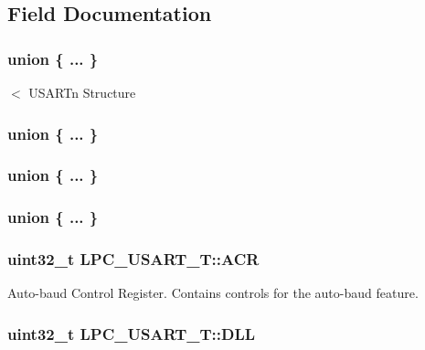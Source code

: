 \subsection{Field Documentation}
\hypertarget{structLPC__USART__T_a3ee22c4a9706e4fbaa69d0743fa3c269}{\subsubsection[{"@23}]{\setlength{\rightskip}{0pt plus 5cm}union \{ ... \} }}\label{structLPC__USART__T_a3ee22c4a9706e4fbaa69d0743fa3c269}
$<$ U\-S\-A\-R\-Tn Structure \hypertarget{structLPC__USART__T_ab1491a5ac3758bc997d3adb7d4f37d9f}{\subsubsection[{"@25}]{\setlength{\rightskip}{0pt plus 5cm}union \{ ... \} }}\label{structLPC__USART__T_ab1491a5ac3758bc997d3adb7d4f37d9f}
\hypertarget{structLPC__USART__T_a561feb6fc71da88f1f5bbfac07237cad}{\subsubsection[{"@27}]{\setlength{\rightskip}{0pt plus 5cm}union \{ ... \} }}\label{structLPC__USART__T_a561feb6fc71da88f1f5bbfac07237cad}
\hypertarget{structLPC__USART__T_a4d7be08518eac0076ed84428a59038e5}{\subsubsection[{"@29}]{\setlength{\rightskip}{0pt plus 5cm}union \{ ... \} }}\label{structLPC__USART__T_a4d7be08518eac0076ed84428a59038e5}
\hypertarget{structLPC__USART__T_a443bb067899c7f269dc903a26522f44b}{
\subsubsection[{A\-C\-R}]{ uint32\-\_\-t L\-P\-C\-\_\-\-U\-S\-A\-R\-T\-\_\-\-T\-::\-A\-C\-R}}\label{structLPC__USART__T_a443bb067899c7f269dc903a26522f44b}
Auto-\/baud Control Register. Contains controls for the auto-\/baud feature. \hypertarget{structLPC__USART__T_ac2e91646e820b1527747154d82778e48}{
\subsubsection[{D\-L\-L}]{ uint32\-\_\-t L\-P\-C\-\_\-\-U\-S\-A\-R\-T\-\_\-\-T\-::\-D\-L\-L}}\label{structLPC__USART__T_ac2e91646e820b1527747154d82778e48}
